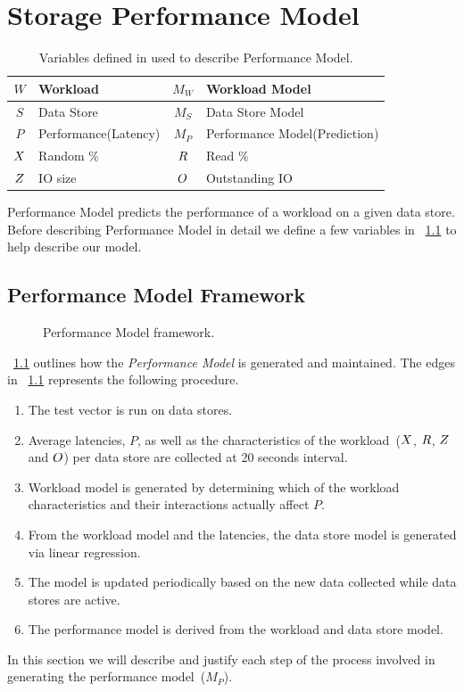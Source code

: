 \chapter{Storage Performance Model}
\label{SPM}

\begin{table}[!t]
\centering
\begin{tabularx}{\textwidth}{c|X||c|X}
\hline
$W$     & Workload                      & $M_W$   & Workload Model \\ \hline
$S$     & Data Store                    & $M_S$   & Data Store Model \\ \hline
$P$     & Performance(Latency)          & $M_P$   & Performance Model(Prediction) \\ \hline
$X$ & Random \%                     & $R$ & Read \% \\ \hline
$Z$ & IO size                       & $O$  & Outstanding IO \\ \hline
\end{tabularx}
\caption{Variables defined in used to describe \romano Performance Model.}
\label{terminology}
\end{table}

\romano Performance Model predicts the performance of a workload on a given data store. 
Before describing \romano Performance Model in detail we define a few variables in \tablename~\ref{terminology} to help describe our model.

\section{\romano Performance Model Framework}

\begin{figure}[!t]
\centering

\caption{\romano Performance Model framework.}
\label{rpm}
\end{figure}

\figurename~\ref{rpm} outlines how the \emph{\romano Performance Model} is generated and maintained.
The edges in \figurename~\ref{rpm} represents the following procedure.\
\begin{enumerate}
\item The test vector is run on data stores.
\item Average latencies, $P$, as well as the characteristics of the workload~($X$, $R$, $Z$ and $O$) per data store are collected at 20 seconds interval.
\item Workload model is generated by determining which of the workload characteristics and their interactions actually affect $P$.
\item From the workload model and the latencies, the data store model is generated via linear regression.
\item The model is updated periodically based on the new data collected while data stores are active.
\item The performance model is derived from the workload and data store model.
\end{enumerate}
In this section we will describe and justify each step of the process involved in generating the performance model~($M_P$).

